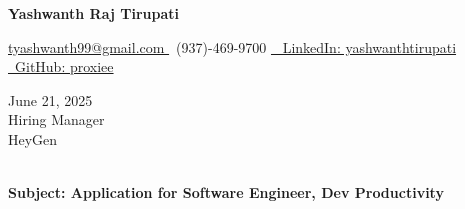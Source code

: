 \documentclass[letterpaper,11pt]{article}
\begin{document}
\begin{center}
    \textbf{\LARGE Yashwanth Raj Tirupati}
    \vspace{4pt}
    
    \small
    \href{mailto:tyashwanth99@gmail.com}{ tyashwanth99@gmail.com }\textbar
     ~(937)-469-9700 \textbar
    \href{https://linkedin.com/in/yashwanthtirupati}{~ LinkedIn: yashwanthtirupati }\textbar 
    \href{https://github.com/proxiee}{~GitHub: proxiee }
\end{center}

\vspace{20pt}

\begin{flushleft}
    June 21, 2025 \\
    \vspace{12pt}
    Hiring Manager \\
    HeyGen \\
    [Location from Job Description - if available, otherwise remove this line] \\
\end{flushleft}


\begin{flushleft}
\textbf{Subject: Application for Software Engineer, Dev Productivity}
\end{flushleft}


\end{document}
